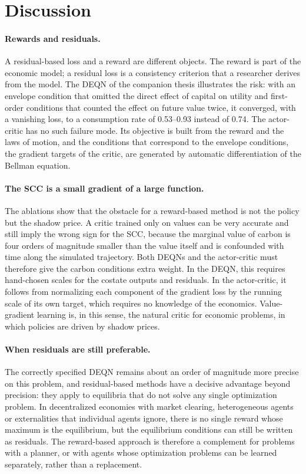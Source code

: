 \section{Discussion}
\label{sec:discussion}

\paragraph{Rewards and residuals.} A residual-based loss and a reward are different objects. The reward is part of the economic model; a residual loss is a consistency criterion that a researcher derives from the model. The DEQN of the companion thesis illustrates the risk: with an envelope condition that omitted the direct effect of capital on utility and first-order conditions that counted the effect on future value twice, it converged, with a vanishing loss, to a consumption rate of 0.53--0.93 instead of 0.74. The actor-critic has no such failure mode. Its objective is built from the reward and the laws of motion, and the conditions that correspond to the envelope conditions, the gradient targets of the critic, are generated by automatic differentiation of the Bellman equation.

\paragraph{The SCC is a small gradient of a large function.} The ablations show that the obstacle for a reward-based method is not the policy but the shadow price. A critic trained only on values can be very accurate and still imply the wrong sign for the SCC, because the marginal value of carbon is four orders of magnitude smaller than the value itself and is confounded with time along the simulated trajectory. Both DEQNs and the actor-critic must therefore give the carbon conditions extra weight. In the DEQN, this requires hand-chosen scales for the costate outputs and residuals. In the actor-critic, it follows from normalizing each component of the gradient loss by the running scale of its own target, which requires no knowledge of the economics. Value-gradient learning is, in this sense, the natural critic for economic problems, in which policies are driven by shadow prices.

\paragraph{When residuals are still preferable.} The correctly specified DEQN remains about an order of magnitude more precise on this problem, and residual-based methods have a decisive advantage beyond precision: they apply to equilibria that do not solve any single optimization problem. In decentralized economies with market clearing, heterogeneous agents or externalities that individual agents ignore, there is no single reward whose maximum is the equilibrium, but the equilibrium conditions can still be written as residuals. The reward-based approach is therefore a complement for problems with a planner, or with agents whose optimization problems can be learned separately, rather than a replacement.

